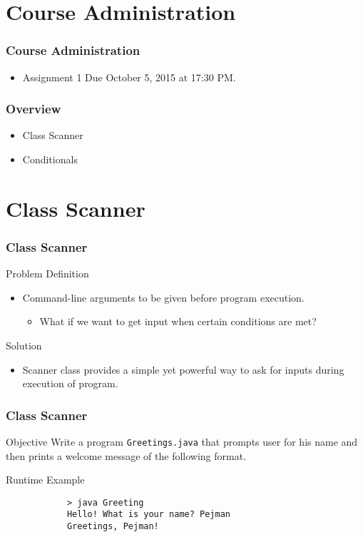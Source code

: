 \documentclass[10pt, compress]{beamer}
\begin{document}
\prepareCover

\section{Course Administration}

\begin{frame}[fragile]
\frametitle{Course Administration}
	\begin{itemize}
		\item[] Assignment 1 Due October 5, 2015 at 17:30 PM.
	\end{itemize}
\end{frame}

\begin{frame}[fragile]
	\frametitle{Overview}
	\begin{itemize}
		\item[] Class Scanner
		\item[] Conditionals
	\end{itemize}
\end{frame}

\section{Class Scanner}

\begin{frame}[fragile]
	\frametitle{Class Scanner}
	\begin{block}{Problem Definition}
		\begin{itemize}
			\item[] Command-line arguments to be given before program execution.
			\begin{itemize}
				\item[] What if we want to get input when certain conditions are met?
			\end{itemize}
		\end{itemize}
	\end{block}
	\begin{block}{Solution}
		\begin{itemize}
			\item[] Scanner class provides a simple yet powerful way to ask for inputs during execution of program.
		\end{itemize}
	\end{block}
\end{frame}

\begin{frame}[fragile]
	\frametitle{Class Scanner}
	\begin{block}{Objective}
		Write a program \texttt{Greetings.java} that prompts user for his name and then prints a welcome message of the following format.
	\end{block}
	\begin{block}{Runtime Example}
		\begin{verbatim}
			> java Greeting
			Hello! What is your name? Pejman
			Greetings, Pejman!
		\end{verbatim}
	\end{block}
\end{frame}
\end{document}
